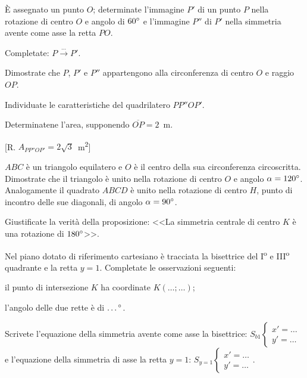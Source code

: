 \begin{esercizio}
\label{ese:8.66} %
\`E assegnato un punto $O$; determinate l'immagine $P'$ di un punto $P$ nella rotazione di centro $O$ e angolo di $60{}^{\circ}$ e l'immagine $P''$ di $P'$ nella simmetria avente come asse la retta $PO$.
\begin{enumeratea}
\item Completate: $P \overset{\ldots{}}\longrightarrow P'$. 
\item Dimostrate che $P$, $P'$ e $P''$ appartengono alla circonferenza di centro $O$ e raggio $OP$.
\item Individuate le caratteristiche del quadrilatero $PP''OP'$.
\item Determinatene l'area, supponendo $\overline{OP}=2$~m.
\end{enumeratea}
[R. $A_{PP''OP'}=2\sqrt{3}$~m\textsuperscript{2}]
\end{esercizio}

\begin{esercizio}
\label{ese:8.67} %
$ABC$ è un triangolo equilatero e $O$ è il centro della sua circonferenza circoscritta. Dimostrate che il triangolo è unito nella rotazione di centro $O$ e angolo $\alpha=120{}^{\circ}$. Analogamente il quadrato $ABCD$ è unito nella rotazione di centro $H$, punto di incontro delle sue diagonali, di angolo $\alpha=90{}^{\circ}$.
\end{esercizio}

\begin{esercizio}
\label{ese:8.68} %
Giustificate la verità della proposizione: <<La simmetria centrale di centro $K$ è una rotazione di $180{}^{\circ}$>>.
\end{esercizio}

\begin{esercizio}
\label{ese:8.69} %
Nel piano dotato di riferimento cartesiano è tracciata la bisettrice del I\textsuperscript{o} e III\textsuperscript{o} quadrante e la retta $y=1$. Completate le osservazioni seguenti:
\begin{enumeratea}
\item il punto di intersezione $K$ ha coordinate $K(\ldots{};\ldots{})$;
\item l'angolo delle due rette è di $\ldots{}{}^{\circ}$.
\end{enumeratea}
\end{esercizio}

\begin{esercizio}
\label{ese:8.70} %
Scrivete l'equazione della simmetria avente come asse la bisettrice: $S_{b1}\begin{cases}x'=\ldots{}\\y'=\ldots{}\end{cases}$ e l'equazione della simmetria di asse la retta $y=1$: $S_{y=1}\begin{cases}x'=\ldots{}\\y'=\ldots{}\end{cases}$.
\end{esercizio}


